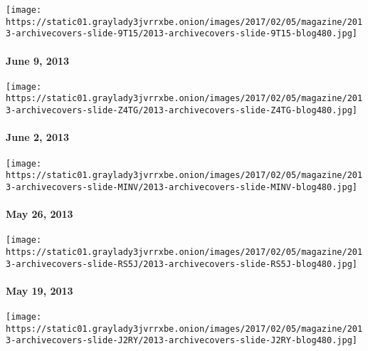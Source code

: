 \href{http://www.nytimes3xbfgragh.onion/indexes/2013/06/09/magazine/index.html}{}

\texttt{[image: https://static01.graylady3jvrrxbe.onion/images/2017/02/05/magazine/2013-archivecovers-slide-9T15/2013-archivecovers-slide-9T15-blog480.jpg]}

\hypertarget{june-9-2013}{%
\paragraph{June 9, 2013}\label{june-9-2013}}

\href{http://www.nytimes3xbfgragh.onion/indexes/2013/06/02/magazine/index.html}{}

\texttt{[image: https://static01.graylady3jvrrxbe.onion/images/2017/02/05/magazine/2013-archivecovers-slide-Z4TG/2013-archivecovers-slide-Z4TG-blog480.jpg]}

\hypertarget{june-2-2013}{%
\paragraph{June 2, 2013}\label{june-2-2013}}

\href{http://www.nytimes3xbfgragh.onion/indexes/2013/05/26/magazine/index.html}{}

\texttt{[image: https://static01.graylady3jvrrxbe.onion/images/2017/02/05/magazine/2013-archivecovers-slide-MINV/2013-archivecovers-slide-MINV-blog480.jpg]}

\hypertarget{may-26-2013}{%
\paragraph{May 26, 2013}\label{may-26-2013}}

\href{http://www.nytimes3xbfgragh.onion/indexes/2013/05/20/magazine/index.html}{}

\texttt{[image: https://static01.graylady3jvrrxbe.onion/images/2017/02/05/magazine/2013-archivecovers-slide-RS5J/2013-archivecovers-slide-RS5J-blog480.jpg]}

\hypertarget{may-19-2013}{%
\paragraph{May 19, 2013}\label{may-19-2013}}

\href{http://www.nytimes3xbfgragh.onion/indexes/2013/05/12/magazine/index.html}{}

\texttt{[image: https://static01.graylady3jvrrxbe.onion/images/2017/02/05/magazine/2013-archivecovers-slide-J2RY/2013-archivecovers-slide-J2RY-blog480.jpg]}

